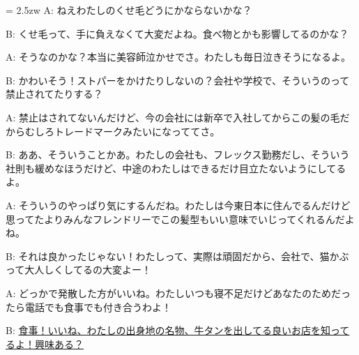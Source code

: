 \documentclass[11pt]{amsart}
\title{}
\author{}
\newenvironment{hangall}[1]{\hangindent = 2.5zw\everypar{\hangindent = 2.5zw}}{}
\begin{document}
\maketitle
\begin{hangall}{}%
A: ねえわたしのくせ毛どうにかならないかな？

B: くせ毛って、手に負えなくて大変だよね。食べ物とかも影響してるのかな？

A: そうなのかな？本当に美容師泣かせでさ。わたしも毎日泣きそうになるよ。

B: かわいそう！ストパーをかけたりしないの？会社や学校で、そういうのって禁止されてたりする？

A: 禁止はされてないんだけど、今の会社には新卒で入社してからこの髪の毛だからむしろトレードマークみたいになっててさ。

B: ああ、そういうことかあ。わたしの会社も、フレックス勤務だし、そういう社則も緩めなほうだけど、中途のわたしはできるだけ目立たないようにしてるよ。

A: そういうのやっぱり気にするんだね。わたしは今東日本に住んでるんだけど思ってたよりみんなフレンドリーでこの髪型もいい意味でいじってくれるんだよね。

B: それは良かったじゃない！わたしって、実際は頑固だから、会社で、猫かぶって大人しくしてるの大変よー！

A: どっかで発散した方がいいね。わたしいつも寝不足だけどあなたのためだったら電話でも食事でも付き合うわよ！

B: \ul{食事！いいね、わたしの出身地の名物、牛タンを出してる良いお店を知ってるよ！興味ある？}\end{hangall}
\end{document}
